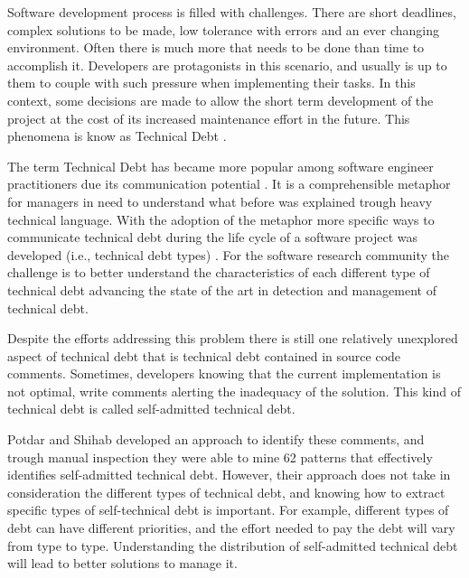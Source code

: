 Software development process is filled with challenges. There are short deadlines, complex solutions to be made, low tolerance with errors and an ever changing environment. Often there is much more that needs to be done than time to accomplish it. Developers are protagonists in this scenario, and usually is up to them to couple with such pressure when implementing their tasks. In this context, some decisions are made to allow the short term development of the project at the cost of its increased maintenance effort in the future. This phenomena is know as Technical Debt \cite{Cunningham1992}. 

The term Technical Debt has became more popular among software engineer practitioners due its communication potential \cite{Spinola2013MTD}. It is a comprehensible metaphor for managers in need to understand what before was explained trough heavy technical language. With the adoption of the metaphor more specific ways to communicate technical debt during the life cycle of a software project was developed (i.e., technical debt types) \cite{Alves2014MTD}\cite{Kruchten2012}. For the software research community the challenge is to better understand the characteristics of each different type of technical debt advancing the state of the art in detection and management of technical debt.


Despite the efforts addressing this problem there is still one relatively unexplored aspect of technical debt that is technical debt contained in source code comments. Sometimes, developers knowing that the current implementation is not optimal, write comments alerting the inadequacy of the solution. This kind of technical debt is called self-admitted technical debt. 

Potdar and Shihab \cite{Potdar2014ICSME} developed an approach to identify these comments, and trough manual inspection they were able to mine 62 patterns that effectively identifies self-admitted technical debt. However, their approach does not take in consideration the different types of technical debt, and knowing how to extract specific types of self-technical debt is important. For example, different types of debt can have different priorities, and the effort needed to pay the debt will vary from type to type. Understanding the distribution of self-admitted technical debt will lead to better solutions to manage it.

